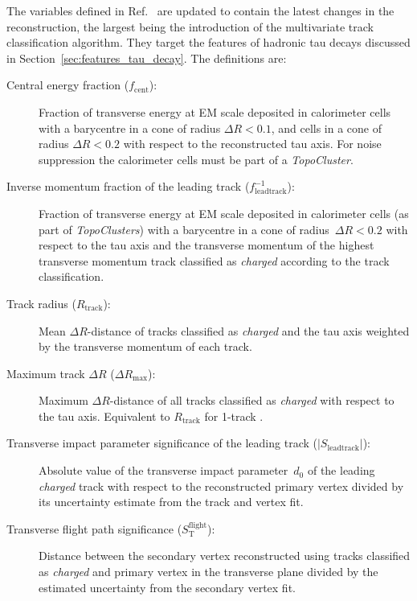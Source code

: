 The variables defined in Ref.~\cite{atlas:taurec:run2} are updated to contain
the latest changes in the reconstruction, the largest being the introduction of
the multivariate track classification algorithm. They target the features of
hadronic tau decays discussed in Section~\ref{sec:features_tau_decay}. The
definitions are:
\begin{description}
\item[Central energy fraction ($f_\text{cent}$):] Fraction of transverse energy
  at EM scale deposited in calorimeter cells with a barycentre in a cone of
  radius $\Delta R < 0.1$, and cells in a cone of radius $\Delta R < 0.2$ with
  respect to the reconstructed tau axis.
  For noise suppression the calorimeter cells must be part of a
  \emph{TopoCluster}.

\item[Inverse momentum fraction of the leading track
  ($f_\text{leadtrack}^{-1}$):] Fraction of transverse energy at EM scale
  deposited in calorimeter cells (as part of \emph{TopoClusters}) with a
  barycentre in a cone of radius~$\Delta R < 0.2$ with respect to the tau axis
  and the transverse momentum of the highest transverse momentum track
  classified as \emph{charged} according to the track classification.

\item[Track radius ($R_\text{track}$):] Mean $\Delta R$-distance of tracks
  classified as \emph{charged} and the tau axis weighted by the transverse
  momentum of each track.

\item[Maximum track $\Delta R$ ($\Delta R_\text{max}$):] Maximum
  $\Delta R$-distance of all tracks classified as \emph{charged} with respect to
  the tau axis. Equivalent to $R_\text{track}$ for 1-track \tauhadvis.

\item[Transverse impact parameter significance of the leading track
  ($| S_\text{leadtrack} |$):] Absolute value of the transverse impact
  parameter~$d_0$ of the leading \emph{charged} track with respect to the
  reconstructed primary vertex divided by its uncertainty estimate from the
  track and vertex fit.

\item[Transverse flight path significance ($S_\text{T}^\text{flight}$):]
  Distance between the secondary vertex reconstructed using tracks classified as
  \emph{charged} and primary vertex in the transverse plane divided by the
  estimated uncertainty from the secondary vertex fit.


\end{description}
